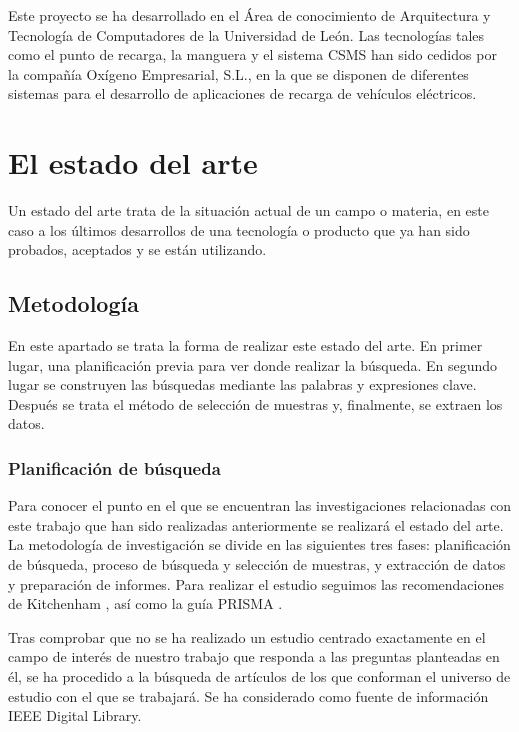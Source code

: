 \documentclass[12pt,a4paper,onecolumn,oneside]{report}
\begin{document}
Este proyecto se ha desarrollado en el Área de conocimiento de Arquitectura y Tecnología de Computadores de la Universidad de
León. Las tecnologías tales como el punto de recarga, la manguera y el sistema CSMS han sido cedidos por la compañía Oxígeno Empresarial, S.L., en la que se disponen de diferentes sistemas para el desarrollo de aplicaciones de recarga de vehículos eléctricos. 


\section{El estado del arte}

Un estado del arte trata de la situación actual de un campo o materia, en este caso a los últimos desarrollos de una tecnología o producto que ya han sido probados, aceptados y se están utilizando.

\subsection{Metodología}

En este apartado se trata la forma de realizar este estado del arte. En primer lugar, una planificación previa para ver donde realizar la búsqueda. En segundo lugar se construyen las búsquedas mediante las palabras y expresiones clave. Después se trata el método de selección de muestras y, finalmente, se extraen los datos.

\subsubsection{Planificación de búsqueda}

Para conocer el punto en el que se encuentran las investigaciones relacionadas con este trabajo que han sido realizadas anteriormente se realizará el estado del arte. La metodología de investigación se divide en las siguientes tres fases: planificación de búsqueda, proceso de búsqueda y selección de muestras, y extracción de datos y preparación de informes. Para realizar el estudio seguimos las recomendaciones de Kitchenham \cite{nueve}, así como la guía PRISMA \cite{diez}. 

Tras comprobar que no se ha realizado un estudio centrado exactamente en el campo de interés de nuestro trabajo que responda a las preguntas planteadas en él, se ha procedido a la búsqueda de artículos de los que conforman el universo de estudio con el que se trabajará. Se ha considerado como fuente de información IEEE Digital Library.
\end{document}
